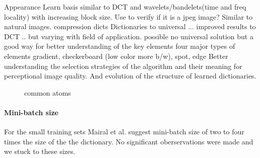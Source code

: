 Appearance 
Learn basis similar to DCT and wavelets/bandelets(time and freq locality) with
increasing block size. Use to verify if it is a jpeg image?
Similar to natural images.
compression dicts
Dictionaries to universal ... improved results to DCT .. but varying with field
of application. possible no universal solution but a good way for better
understanding of the key elements
  four major types of elements
  gradient, checkerboard (low color more b/w), spot, edge
Better understanding the selection strategies of the algorithm and their
meaning for perceptional image quality. And evolution of the structure of
learned dictionaries. 

\begin{figure}[h]
\centering
{}
\hspace{5mm}
\hspace{5mm}
\hspace{5mm}
\hspace{5mm}
\caption{common atoms}
\end{figure}

\paragraph{Mini-batch size}
For the small training sets Mairal et al. suggest mini-batch size of two to four
times the size of the the dictionary. No significant oberservations were made
and we stuck to these sizes. 

